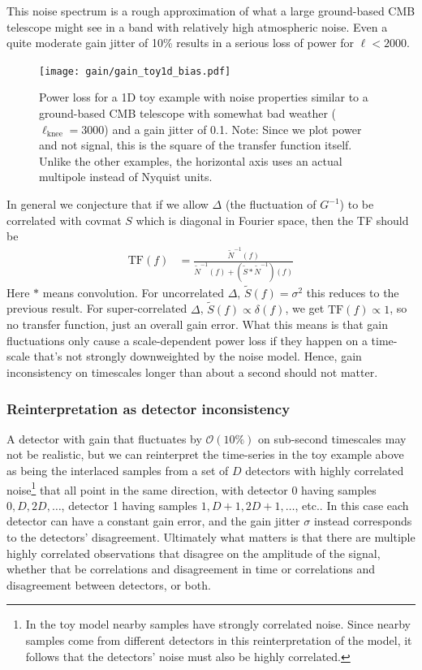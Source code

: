 \documentclass[twocolumn,apj]{aastex63}
\begin{document}
This noise spectrum is a rough approximation of what a large ground-based CMB telescope
might see in a band with relatively high atmospheric noise. Even a quite moderate
gain jitter of 10\% results in a serious loss of power for $\ell < 2000$.
\begin{figure}[ht]
	\centering
	\texttt{[image: gain/gain\_toy1d\_bias.pdf]}
	\caption{Power loss for a 1D toy example with noise properties similar to
	a ground-based CMB telescope with somewhat bad weather ($\ell_\text{knee}=3000$)
	and a gain jitter of 0.1. Note: Since we plot power and not signal, this is the
	square of the transfer function itself. Unlike the other examples, the horizontal axis
	uses an actual multipole instead of Nyquist units.}
	\label{fig:gain-tf-1d}
\end{figure}

In general we conjecture that if we allow $\Delta$ (the fluctuation of $G^{-1}$)
to be correlated with covmat $S$ which is diagonal in Fourier space, then the TF should be
\begin{align}
\text{TF}(f) &= \frac{\widetilde{N}^{-1}(f)}{\widetilde{N}^{-1}(f) + (\widetilde{S} \ast \widetilde{N}^{-1})(f)}
\end{align}
Here $\ast$ means convolution. For uncorrelated $\Delta$, $\widetilde S(f) = \sigma^2$
this reduces to the previous result.
For super-correlated $\Delta$, $\widetilde S(f) \propto \delta(f)$, we get $\text{TF}(f) \propto 1$,
so no transfer function, just an overall gain error. What this means is that gain fluctuations
only cause a scale-dependent power loss if they happen on a time-scale that's not strongly
downweighted by the noise model. Hence, gain inconsistency on timescales longer than about a
second should not matter.

\subsubsection{Reinterpretation as detector inconsistency}
A detector with gain that fluctuates by $\mathcal{O}(10\%)$ on sub-second timescales may not be
realistic, but we can reinterpret the time-series in the toy example above as being the interlaced
samples from a set of $D$ detectors with highly correlated noise\footnote{
In the toy model nearby samples have strongly correlated noise. Since nearby samples come from
different detectors in this reinterpretation of the model, it follows that the detectors' noise
must also be highly correlated.
} that all point in the same direction, with detector 0 having
samples $0,D,2D,\ldots$, detector 1 having samples $1,D+1,2D+1,\ldots$, etc.. In this case each detector
can have a constant gain error, and the gain jitter $\sigma$ instead corresponds to the detectors'
disagreement. Ultimately what matters is that there are multiple highly correlated observations
that disagree on the amplitude of the signal, whether that be correlations and disagreement in
time or correlations and disagreement between detectors, or both.
\end{document}
